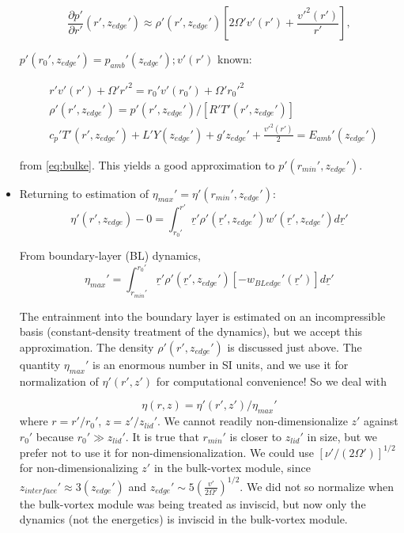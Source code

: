 \documentclass[preprint, prX]{revtex4}
\newcommand{\pd}[2]{\frac{\partial#1}{\partial#2}}
\newcommand{\rmin}{r_{min}}
\newcommand{\zedge}{z_{edge}}
\newcommand{\zinter}{z_{interface}}
\begin{document}
\begin{itemize}
\begin{equation}
	\pd{ p'}{ r'}(r', \zedge') \approx \rho'(r',\zedge') \left [ 2 \Omega' v'(r') + \frac{v'^2(r')}{r'} \right ], 
	\label{eq:bulkdpdr}
\end{equation}
\begin{center}
$p'(r_0', \zedge') = p_{amb}'(\zedge'); v'(r')$ known:
\label{eq:bulkdpdz}
\end{center}
\begin{equation}
\begin{split}
	&r'v'(r') + \Omega' r'^2 = r_0' v'(r_0') + \Omega' r_0'^2 \\
	&\rho'(r', \zedge') = p'(r',\zedge') /[R' T'(r',\zedge')]\\
	&c_p' T'(r',\zedge') + L'Y(\zedge') + g'\zedge' + \frac{v'^2(r')}{2} = E_{amb}'(\zedge')
\end{split}
\label{eq:bulkpvknown}
\end{equation}

from \eqref{eq:bulke}. This yields a good approximation to $p'(\rmin', \zedge')$.

\item Returning to estimation of $\eta_{max}' = \eta'(\rmin', \zedge')$:
\begin{equation}
	\eta'(r',\zedge) - 0 = \int_{r_0'}^{r'} \underline{r}' \rho'(\underline{r}', \zedge') w'(\underline{r}', \zedge') d\underline{r}'
\end{equation}

From boundary-layer (BL) dynamics,
\begin{equation}
	\eta_{max}' = \int_{\rmin'}^{r_0'} \underline{r}' \rho'(\underline{r}', \zedge')\left [ -w_{BL edge}'(\underline{r}')\right ] d\underline{r}'
\end{equation}

The entrainment into the boundary layer is estimated on an incompressible basis (constant-density treatment of the dynamics), but we accept this approximation. The density $\rho'(r',\zedge')$ is discussed just above. The quantity $\eta_{max}'$ is an enormous number in SI units, and we use it for normalization of $\eta'(r',z')$ for computational convenience! So we deal with 

\begin{equation}
	\eta(r,z) = \eta'(r',z')/\eta_{max}'
\end{equation}
where $r = r'/r_0'$, $z=z'/z_{lid}'$. We cannot readily non-dimensionalize $z'$ against $r_0'$ because $r_0' \gg z_{lid}'$. It is true that $\rmin'$ is closer to $z_{lid}'$ in size, but we prefer not to use it for non-dimensionalization. We could use $[\nu'/(2\Omega')]^{1/2}$ for non-dimensionalizing $z'$ in the bulk-vortex module, since $\zinter' \approx 3(\zedge')$ and $\zedge' \sim 5 \left( \frac{v'}{2\Omega'}\right)^{1/2}$. We did not so normalize when the bulk-vortex module was being treated as inviscid, but now only the dynamics (not the energetics) is inviscid in the bulk-vortex module.


\end{itemize}
\end{document}
